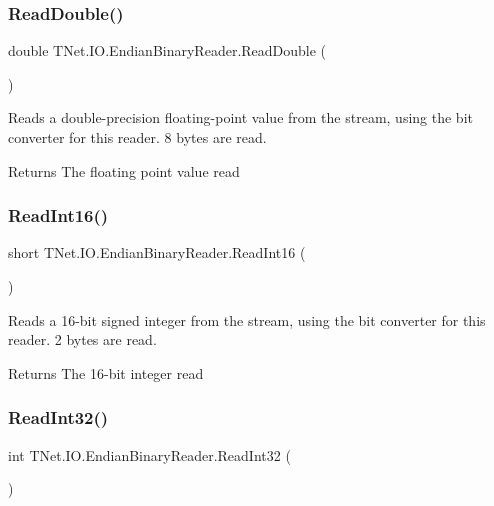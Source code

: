 \subsubsection{\texorpdfstring{Read\+Double()}{ReadDouble()}}
{\footnotesize\ttfamily double T\+Net.\+I\+O.\+Endian\+Binary\+Reader.\+Read\+Double (\begin{DoxyParamCaption}{ }\end{DoxyParamCaption})}



Reads a double-\/precision floating-\/point value from the stream, using the bit converter for this reader. 8 bytes are read. 

\begin{DoxyReturn}{Returns}
The floating point value read
\end{DoxyReturn}
\mbox{\label{class_t_net_1_1_i_o_1_1_endian_binary_reader_a6e160055b65116bd439d27956ee13569}} 
\subsubsection{\texorpdfstring{Read\+Int16()}{ReadInt16()}}
{\footnotesize\ttfamily short T\+Net.\+I\+O.\+Endian\+Binary\+Reader.\+Read\+Int16 (\begin{DoxyParamCaption}{ }\end{DoxyParamCaption})}



Reads a 16-\/bit signed integer from the stream, using the bit converter for this reader. 2 bytes are read. 

\begin{DoxyReturn}{Returns}
The 16-\/bit integer read
\end{DoxyReturn}
\mbox{\label{class_t_net_1_1_i_o_1_1_endian_binary_reader_adcc78fb1a9961b47818c2a9d4c9f71bd}} 
\subsubsection{\texorpdfstring{Read\+Int32()}{ReadInt32()}}
{\footnotesize\ttfamily int T\+Net.\+I\+O.\+Endian\+Binary\+Reader.\+Read\+Int32 (\begin{DoxyParamCaption}{ }\end{DoxyParamCaption})}



